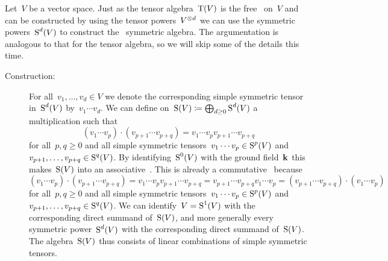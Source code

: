 \begin{recall}
  Let~$V$ be a vector space.
  Just as the tensor algebra~$\operatorname{T}(V)$ is the free~{\algebra{$\kf$}} on~$V$ and can be constructed by using the tensor powers~$V^{\otimes d}$ we can use the symmetric powers~$\operatorname{S}^d(V)$ to construct the ~\gls*{symmetric algebra}.
  The argumentation is analogous to that for the tensor algebra, so we will skip some of the details this time.
  
  \begin{description}
    \item[Construction:]
      For all~$v_1, \dotsc, v_d \in V$ we denote the corresponding simple symmetric tensor in~$\operatorname{S}^d(V)$ by~$v_1 \dotsm v_d$.
      We can define on~$\operatorname{S}(V) \coloneqq \bigoplus_{d \geq 0} \operatorname{S}^d(V)$ a multiplication such that
      \[
        (v_1 \dotsm v_p) \cdot (v_{p+1} \dotsm v_{p+q})
        =
        v_1 \dotsm v_p v_{p+1} \dotsm v_{p+q}
      \]
      for all~$p, q \geq 0$ and all simple symmetric tensors~$v_1 \dotsm v_p \in \operatorname{S}^p(V)$ and~$v_{p+1}, \dotsc, v_{p+q} \in \operatorname{S}^q(V)$.
      By identifying~$\operatorname{S}^0(V)$ with the ground field~$\kf$ this makes~$\operatorname{S}(V)$ into an associative~{\algebra{$\kf$}}.
      This is already a commutative~{\algebra{$\kf$}} because
      \[
        (v_1 \dotsm v_p) \cdot (v_{p+1} \dotsm v_{p+q})
        =
        v_1 \dotsm v_p v_{p+1} \dotsm v_{p+q}
        =
        v_{p+1} \dotsm v_{p+q} v_1 \dotsm v_p
        =
        (v_{p+1} \dotsm v_{p+q}) \cdot (v_1 \dotsm v_p)
      \]
      for all~$p, q \geq 0$ and all simple symmetric tensors~$v_1 \dotsm v_p \in \operatorname{S}^p(V)$ and~$v_{p+1}, \dotsc, v_{p+q} \in \operatorname{S}^q(V)$. 
      We can identify~$V = \operatorname{S}^1(V)$ with the corresponding direct summand of~$\operatorname{S}(V)$, and more generally every symmetric power~$\operatorname{S}^d(V)$ with the corresponding direct summand of~$\operatorname{S}(V)$.
      The algebra~$\operatorname{S}(V)$ thus consists of linear combinations of simple symmetric tensors.
      

\end{description}
\end{recall}
